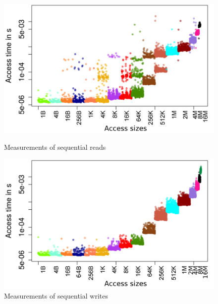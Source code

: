 \documentclass{superfri}
\begin{document}
	\begin{figure}[b]
		\centering
		\begin{minipage}[b]{0.47\textwidth}
			\includegraphics[width=\textwidth]{src/plot_SizeSorted_log_read_seq.png}
			\caption{Measurements of sequential reads}
			\label{read_seq}
		\end{minipage}
		\hfill
		\begin{minipage}[b]{0.47\textwidth}
			\includegraphics[width=\textwidth]{src/plot_SizeSorted_log_write_seq.png}
			\caption{Measurements of sequential writes}
			\label{write_seq}
		\end{minipage}
	\end{figure}
\end{document}
